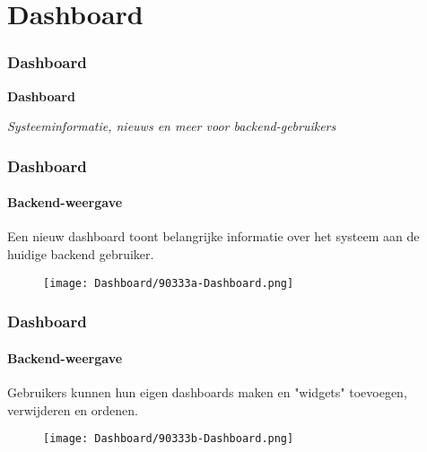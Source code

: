 %

\section{Dashboard}
\begin{frame}[fragile]
	\frametitle{Dashboard}

	\begin{center}\huge{\color{typo3darkgrey}\textbf{Dashboard}}\end{center}
	\begin{center}\large{\textit{Systeeminformatie, nieuws en meer voor backend-gebruikers}}\end{center}

\end{frame}


\begin{frame}[fragile]
	\frametitle{Dashboard}
	\framesubtitle{Backend-weergave}

	Een nieuw dashboard toont belangrijke informatie over het systeem aan de huidige backend gebruiker.

	\begin{figure}
		\texttt{[image: Dashboard/90333a-Dashboard.png]}
	\end{figure}

\end{frame}


\begin{frame}[fragile]
	\frametitle{Dashboard}
	\framesubtitle{Backend-weergave}

	Gebruikers kunnen hun eigen dashboards maken en "widgets" toevoegen, verwijderen en ordenen.

	\begin{figure}
		\texttt{[image: Dashboard/90333b-Dashboard.png]}
	\end{figure}

\end{frame}

